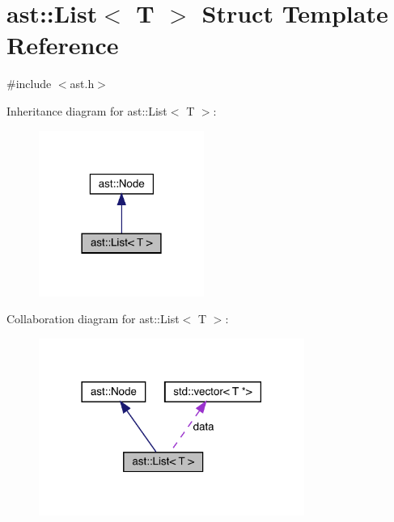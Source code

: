\hypertarget{structast_1_1_list}{}\section{ast\+:\+:List$<$ T $>$ Struct Template Reference}
\label{structast_1_1_list}


{\ttfamily \#include $<$ast.\+h$>$}



Inheritance diagram for ast\+:\+:List$<$ T $>$\+:\nopagebreak
\begin{figure}[H]
\begin{center}
\leavevmode
\includegraphics[width=153pt]{structast_1_1_list__inherit__graph}
\end{center}
\end{figure}


Collaboration diagram for ast\+:\+:List$<$ T $>$\+:\nopagebreak
\begin{figure}[H]
\begin{center}
\leavevmode
\includegraphics[width=246pt]{structast_1_1_list__coll__graph}
\end{center}
\end{figure}

